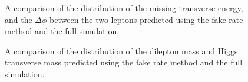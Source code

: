 \begin{figure}[!htbp]
\begin{center}
\caption{A comparison of the distribution of the missing transverse energy, 
and the $\Delta\phi$ between the two leptons predicted using the fake rate method and the
full simulation.}
\label{fig:FakeElectronClosureTest_MetAndDeltaPhi}
\end{center}
\end{figure}

\begin{figure}[!htbp]
\begin{center}
\caption{A comparison of the distribution of the dilepton mass and Higgs transverse mass 
predicted using the fake rate method and the full simulation.}
\label{fig:FakeElectronClosureTest_DileptonMassAndMtHiggs}
\end{center}
\end{figure}


